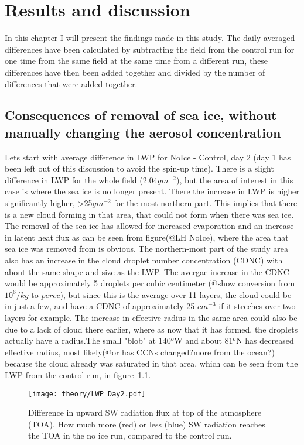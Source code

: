 \chapter{Results and discussion}
\label{chap:results}
In this chapter I will present the findings made in this study.  The daily averaged differences have been calculated by subtracting the field from the control run for one time from the same field at the same time from a different run, these differences have then been added together and divided by the number of differences that were added together.
\section{Consequences of removal of sea ice, without manually changing the aerosol concentration}
Lets start with average difference in LWP for NoIce - Control, day 2 (day 1 has been left out of this discussion to avoid the spin-up time). There is a slight difference in LWP for the whole field (2.04$gm^{-2}$), but the area of interest in this case is where the sea ice is no longer present. There the increase in LWP is higher significantly higher, >25$gm^{-2}$ for the most northern part. This implies that there is a new cloud forming in that area, that could not form when there was sea ice. The removal of the sea ice has allowed for increased evaporation and an increase in latent heat flux as can be seen from figure(@LH NoIce), where the area that sea ice was removed from is obvious. The northern-most part of the study area also has an increase in the cloud droplet number concentration (CDNC) with about the same shape and size as the LWP. The avergae increase in the CDNC would be approximately 5 droplets per cubic centimeter (@show conversion from $10^6/kg$ to $per cc$), but since this is the average over 11 layers, the cloud could be in just a few, and have a CDNC of approximately 25 $cm^{-3}$ if it streches over two layers for example. The increase in effective radius in the same area could also be due to a lack of cloud there earlier, where as now that it has formed, the droplets actually have a radius.The small "blob" at 140$^o$W and about 81$^o$N has decreased effective radius, most likely(@or has CCNs changed?more from the ocean?) because the cloud already was saturated in that area, which can be seen from the LWP from the control run, in figure~\ref{fig:LWPr1Day2}.

\begin{figure}
\centering
\texttt{[image: theory/LWP\_Day2.pdf]}
\caption{Difference in upward SW radiation flux at top of the atmosphere (TOA). How much more (red) or less (blue) SW radiation reaches the TOA in the no ice run, compared to the control run.}
\label{fig:LWPr1Day2}
\end{figure}

